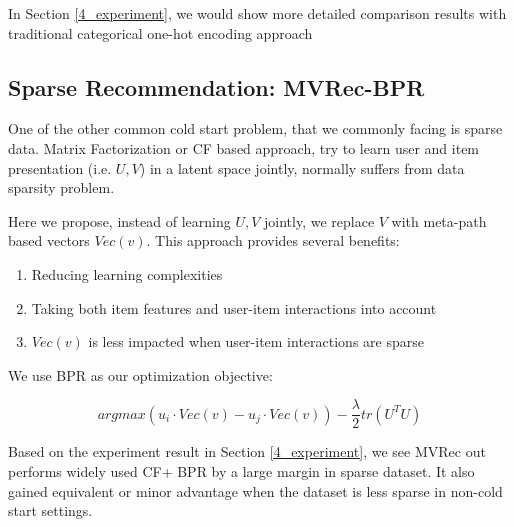 In Section \ref{4_experiment}, we would show more detailed comparison results with traditional categorical one-hot encoding approach

\subsection{Sparse Recommendation: MVRec-BPR}\label{3BPR}
One of the other common cold start problem, that we commonly facing is sparse data. Matrix Factorization or CF based approach, try to learn user and item presentation (i.e. $U, V$) in a latent space jointly, normally suffers from data sparsity problem.


Here we propose, instead of learning $U, V$ jointly, we replace $V$ with meta-path based vectors $Vec(v)$. This approach provides several benefits:
\begin{enumerate}
        \item Reducing learning complexities
        \item Taking both item features and user-item interactions into account
        \item $Vec(v)$ is less impacted when user-item interactions are sparse 
\end{enumerate}

We use BPR as our optimization objective:

\begin{equation}\label{skipgram}
    arg max (u_i \cdot Vec(v)-u_j \cdot Vec(v)) - \dfrac{\lambda}{2}tr(U^TU)
\end{equation}


Based on the experiment result in Section \ref{4_experiment}, we see MVRec out performs widely used CF+ BPR by a large margin in sparse dataset. It also gained equivalent or minor advantage when the dataset is less sparse in non-cold start settings.


